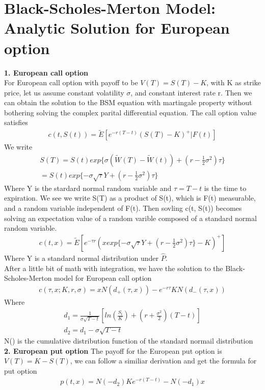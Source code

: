 \documentclass[a4paper]{article}
\begin{document}
\section{Black-Scholes-Merton Model: Analytic Solution for European option}
{\bf1. European call option}\\
For European call option with payoff to be $V(T) = S(T) - K$, with K as strike price, let us assume constant volatility $\sigma$, and constant interest rate r. 
Then we can obtain the solution to the BSM equation with martingale property without bothering solving the complex parital
differential equation. The call option value satisfies
\begin{align*}
	c(t, S(t)) = \tilde E[e^{-r(T-t)}(S(T)-K)^+|F(t)]
\end{align*}
We write
\begin{align*}
	S(T) = S(t) exp\{\sigma(\tilde W(T) -\tilde W(t)) + (r - \frac{1}{2} \sigma^2) \tau\} \\
	     = S(t) exp\{-\sigma \sqrt{\tau} Y + (r - \frac{1}{2}\sigma^2)\tau\}
\end{align*}
Where Y is the stardard normal random variable and $\tau = T - t$ is the time to expiration. We see we write S(T) as a product of S(t), which is F(t) measurable, and a random variable independent of F(t).
Then sovling c(t, S(t)) becomes solving an expectation value of a random varible composed of a standard normal random variable. 
\begin{align*}
	c(t,x) = \tilde E[e^{-\tau r}(x exp\{-\sigma \sqrt{\tau} Y + (r -\frac{1}{2}\sigma^2)\tau\}-K)^+]
\end{align*}
Where Y is a standard normal distribution under $\hat P$.\\
After a little bit of math with integration, we have the solution to the Black-Scholes-Merton model for European call option
\begin{align*}
	c(\tau,x; K,r,\sigma) = xN(d_{+}(\tau,x)) - e^{-r\tau}KN(d_{-}(\tau,x))
\end{align*}
Where
\begin{align*}
	d_1 = \frac{1}{\sigma \sqrt{T-t}}[ln(\frac{S_t}{K}) + (r+ \frac{\sigma^2}{2})(T-t)] \\
	d_2 = d_1 - \sigma \sqrt{T-t}
\end{align*}
N() is the cumulative distribution function of the standard normail distribution
{\bf 2. European put option}
The payoff for the European put option is $V(T) = K - S(T)$, we can follow a similiar derivation and get the formula for put option
\begin{align*}
	p(t,x) = N(-d_2)Ke^{-r(T-t)} -N(-d_1)x
\end{align*}
\end{document}
